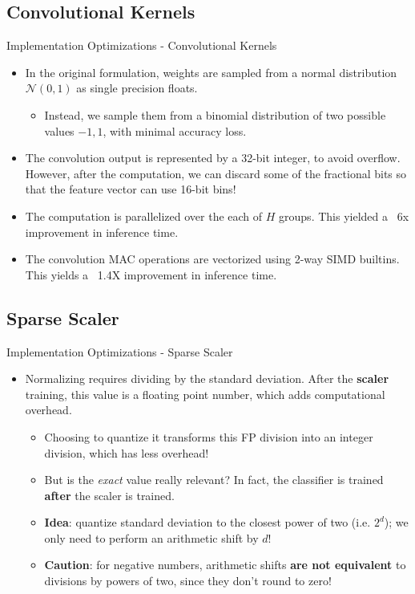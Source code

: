 \documentclass[10pt,aspectratio=169]{beamer}
\begin{document}
\subsection{Convolutional Kernels}
\begin{frame}[fragile]{Implementation Optimizations - Convolutional Kernels}
	\begin{itemize}
		\item In the original formulation, weights are sampled from a normal distribution $\mathcal{N}(0,1)$ as single precision floats.
			\begin{itemize}
				\item Instead, we sample them from a binomial distribution of two possible values ${-1,1}$, with minimal accuracy loss.
			\end{itemize}
            \item The convolution output is represented by a 32-bit integer, to avoid overflow. However, after the computation, we can discard some of the fractional bits so that the feature vector can use 16-bit bins!
		\item The computation is parallelized over the each of $H$ groups. This yielded a ~6x improvement in inference time.
		\item The convolution MAC operations are vectorized using 2-way SIMD builtins. This yields a ~1.4X improvement in inference time.
	\end{itemize}

\end{frame}

\subsection{Sparse Scaler}
\begin{frame}[fragile]{Implementation Optimizations - Sparse Scaler}
	\begin{itemize}
		\item Normalizing requires dividing by the standard deviation. After the \textbf{scaler} training, this value is a floating point number, which adds computational overhead.
			\begin{itemize}
				\item Choosing to quantize it transforms this FP division into an integer division, which has less overhead!
				\item But is the \textit{exact} value really relevant? In fact, the classifier is trained \textbf{after} the scaler is trained.
				\item \textbf{Idea}: quantize standard deviation to the closest power of two (i.e. $2^d$); we only need to perform an arithmetic shift by $d$!
				\item \textbf{Caution}: for negative numbers, arithmetic shifts \textbf{are not equivalent} to divisions by powers of two, since they don't round to zero!
			\end{itemize}
	\end{itemize}
\end{frame}
\end{document}
